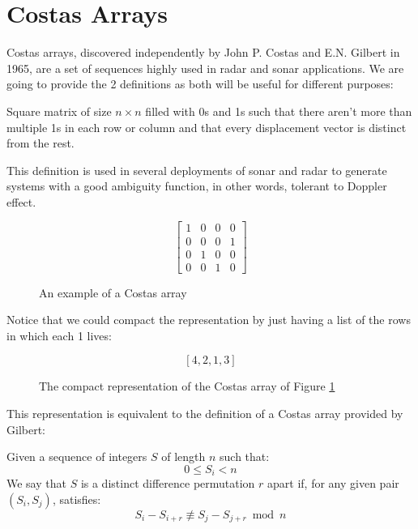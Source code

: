 \section{Costas Arrays}

Costas arrays, discovered independently by John P. Costas\cite{costas_costas}
and E.N. Gilbert \cite{gilbert_costas} in 1965, are a set of sequences highly
used in radar and sonar applications. We are going to provide the 2 definitions
as both will be useful for different purposes:

\begin{definition}
  Square matrix of size $n×n$ filled with 0s and 1s such that there
  aren't more than multiple 1s in each row or column and that every
  displacement vector is distinct from the rest.
\end{definition}

This definition is used in several deployments of sonar and radar to generate
systems with a good ambiguity function, in other words, tolerant to Doppler
effect.

\begin{figure}[ht!]
  $$
  \begin{bmatrix}
   1&0&0&0\\
   0&0&0&1\\
   0&1&0&0\\
   0&0&1&0
  \end{bmatrix}
  $$
  \caption{An example of a Costas array}
  \label{fig:costas_1}
\end{figure}

Notice that we could compact the representation by just having a list of the
rows in which each 1 lives:

\begin{figure}[ht!]
  $$[4, 2, 1, 3]$$
  \caption{The compact representation of the Costas array of Figure
  \ref{fig:costas_1}}
  \label{fig:costas_2}
\end{figure}

This representation is equivalent to the definition of a Costas array provided
by Gilbert:

\begin{definition}\label{def:costas_1}
  Given a sequence of integers $S$ of length $n$ such that:
    \begin{equation}\label{eq:costas_1}
      0 \leq S_{i} < n
    \end{equation}
  We say that $S$ is a distinct difference permutation $r$ apart if,
  for any given pair $(S_{i}, S_{j})$, satisfies:
    \begin{equation}\label{eq:costas_2}
      S_{i} - S_{i+r} \not \equiv S_{j} - S_{j+r} \bmod n
    \end{equation}
\end{definition}

